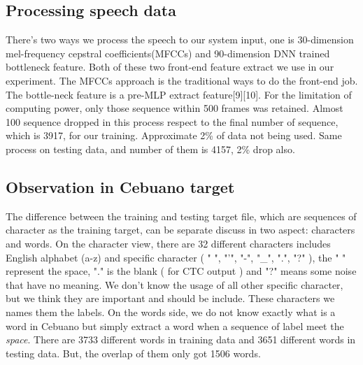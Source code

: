\documentclass[conference]{IEEEtran}
\begin{document}
\subsection{Processing speech data}
There's two ways we process the speech to our system input, one is 30-dimension mel-frequency cepstral coefficients(MFCCs) and 90-dimension DNN trained bottleneck feature.  Both of these two front-end feature extract we use in our experiment.  The MFCCs approach is the traditional ways to do the front-end job.  The bottle-neck feature is a pre-MLP extract feature[9][10]. For the limitation of computing power, only those sequence within 500 frames was retained.  Almost 100 sequence dropped in this process respect to the final number of sequence, which is 3917, for our training.  Approximate 2\% of data not being used.  Same process on testing data, and number of them is 4157, 2\% drop also.  

\subsection{Observation in Cebuano target}
The difference between the training and testing target file, which are sequences of character as the training target, can be separate discuss in two aspect: characters and words.  On the character view, there are 32 different characters includes English alphabet (a-z) and specific character ( " ", "'", "-", "\_", ".", "?" ), the " " represent the space, "." is the blank ( for CTC output ) and "?" means some noise that have no meaning.  We don't know the usage of all other specific character, but we think they are important and should be include.  These characters we names them the labels.  On the words side, we do not know exactly what is a word in Cebuano but simply extract a word when a sequence of label meet the {\it space}.  There are 3733 different words in training data and 3651 different words in testing data.  But, the overlap of them only got 1506 words.  
\end{document}
